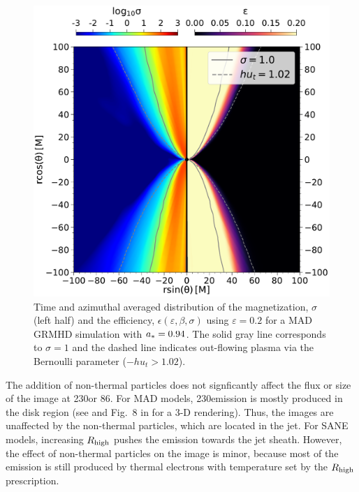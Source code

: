 
\begin{figure}[t!]
  \centering
  \includegraphics[width=\columnwidth]{./figures/GRMHDphiavera0.94sigmaeta.pdf}
  \caption{Time and azimuthal averaged distribution of the magnetization, $\sigma$ (left half) and the efficiency, $\epsilon(\varepsilon,\beta,\sigma)$ using $\varepsilon=0.2 $ for a \bhac MAD GRMHD simulation with $a_*=0.94$. The solid gray line corresponds to $\sigma=1$ and the dashed line indicates out-flowing plasma via the Bernoulli parameter ($-h u_{t}>1.02$).
  }
  \label{fig:varepsilon}
\end{figure}

The addition of non-thermal particles does not signficantly affect the flux or size of the image at 230\GHz or 86\GHz. For MAD models, 230\GHz emission is mostly produced in the disk region (see  and Fig.~8 in \citealt{Wong_2022} for a 3-D rendering).  Thus, the images are unaffected by the non-thermal particles, which are located in the jet. For SANE models, increasing $R_\mathrm{high}$ pushes the emission towards the jet sheath. However, the effect of non-thermal particles on the image is minor, because most of the emission is still produced by thermal electrons with temperature set by the $R_\mathrm{high}$ prescription.

